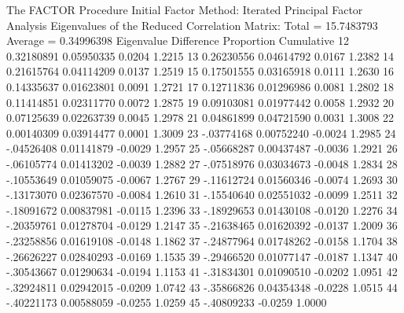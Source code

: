 \documentclass{article}
\begin{document}
\begin{Woutput}
The FACTOR Procedure
Initial Factor Method: Iterated Principal Factor Analysis
Eigenvalues of the Reduced Correlation Matrix: Total = 15.7483793  Average = 0.34996398
        Eigenvalue    Difference    Proportion    Cumulative
  12    0.32180891    0.05950335        0.0204        1.2215
  13    0.26230556    0.04614792        0.0167        1.2382
  14    0.21615764    0.04114209        0.0137        1.2519
  15    0.17501555    0.03165918        0.0111        1.2630
  16    0.14335637    0.01623801        0.0091        1.2721
  17    0.12711836    0.01296986        0.0081        1.2802
  18    0.11414851    0.02311770        0.0072        1.2875
  19    0.09103081    0.01977442        0.0058        1.2932
  20    0.07125639    0.02263739        0.0045        1.2978
  21    0.04861899    0.04721590        0.0031        1.3008
  22    0.00140309    0.03914477        0.0001        1.3009
  23    -.03774168    0.00752240       -0.0024        1.2985
  24    -.04526408    0.01141879       -0.0029        1.2957
  25    -.05668287    0.00437487       -0.0036        1.2921
  26    -.06105774    0.01413202       -0.0039        1.2882
  27    -.07518976    0.03034673       -0.0048        1.2834
  28    -.10553649    0.01059075       -0.0067        1.2767
  29    -.11612724    0.01560346       -0.0074        1.2693
  30    -.13173070    0.02367570       -0.0084        1.2610
  31    -.15540640    0.02551032       -0.0099        1.2511
  32    -.18091672    0.00837981       -0.0115        1.2396
  33    -.18929653    0.01430108       -0.0120        1.2276
  34    -.20359761    0.01278704       -0.0129        1.2147
  35    -.21638465    0.01620392       -0.0137        1.2009
  36    -.23258856    0.01619108       -0.0148        1.1862
  37    -.24877964    0.01748262       -0.0158        1.1704
  38    -.26626227    0.02840293       -0.0169        1.1535
  39    -.29466520    0.01077147       -0.0187        1.1347
  40    -.30543667    0.01290634       -0.0194        1.1153
  41    -.31834301    0.01090510       -0.0202        1.0951
  42    -.32924811    0.02942015       -0.0209        1.0742
  43    -.35866826    0.04354348       -0.0228        1.0515
  44    -.40221173    0.00588059       -0.0255        1.0259
  45    -.40809233                     -0.0259        1.0000


\end{Woutput}
\end{document}
